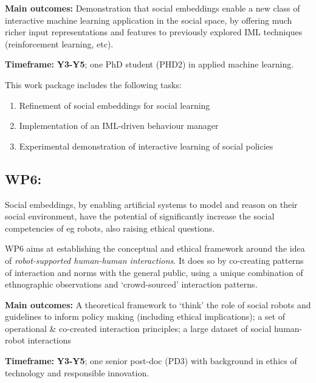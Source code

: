 \begin{oframed}

    \textbf{Main outcomes:} Demonstration that social embeddings enable a new
    class of interactive machine learning application in the social space, by
    offering much richer input representations and features to previously
    explored IML techniques (reinforcement learning, etc).

    \textbf{Timeframe:} \textbf{Y3-Y5}; one PhD student (PHD2) in applied machine
    learning.

\end{oframed}

This work package includes the following tasks:

\begin{enumerate}[label=\textbf{T5.\arabic*}]
    \item{Refinement of social embeddings for social learning}
    \item{Implementation of an IML-driven behaviour manager}
    \item{Experimental demonstration of interactive learning of social policies}
\end{enumerate}

\subsection{WP6: \textbf{\wpSix}}

Social embeddings, by enabling artificial systems
to model and reason on their social environment, have the potential of
significantly increase the social competencies of eg robots, also raising
ethical questions.

WP6 aims at establishing the conceptual and ethical framework around the idea of
\emph{robot-supported human-human interactions}. It does so by co-creating
patterns of interaction and norms with the general public, using a unique
combination of ethnographic observations and `crowd-sourced' interaction
patterns.

\begin{framed}
    \textbf{Main outcomes:} A theoretical framework to `think' the role of
    social robots and guidelines to inform policy making (including ethical
    implications); a set of operational \& co-created interaction principles; a
    large dataset of social human-robot interactions

    \textbf{Timeframe:} \textbf{Y3-Y5}; one senior post-doc (PD3)
with background in ethics of technology and responsible innovation.
\end{framed}

